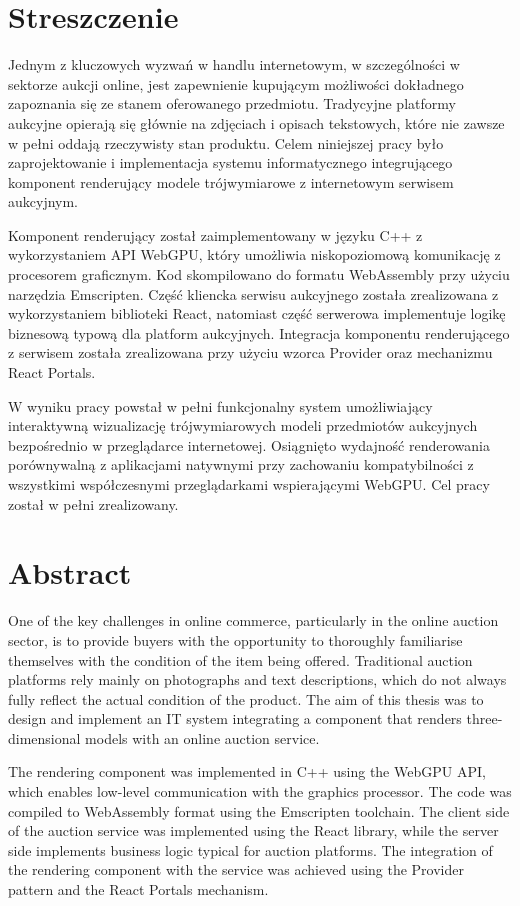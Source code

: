 \section*{Streszczenie}

Jednym z kluczowych wyzwań w handlu internetowym, w szczególności w sektorze aukcji online, jest zapewnienie kupującym możliwości dokładnego zapoznania się ze stanem oferowanego przedmiotu. Tradycyjne platformy aukcyjne opierają się głównie na zdjęciach i opisach tekstowych, które nie zawsze w pełni oddają rzeczywisty stan produktu. Celem niniejszej pracy było zaprojektowanie i implementacja systemu informatycznego integrującego komponent renderujący modele trójwymiarowe z internetowym serwisem aukcyjnym.

Komponent renderujący został zaimplementowany w języku C++ z wykorzystaniem API WebGPU, który umożliwia niskopoziomową komunikację z procesorem graficznym. Kod skompilowano do formatu WebAssembly przy użyciu narzędzia Emscripten. Część kliencka serwisu aukcyjnego została zrealizowana z wykorzystaniem biblioteki React, natomiast część serwerowa implementuje logikę biznesową typową dla platform aukcyjnych. Integracja komponentu renderującego z serwisem została zrealizowana przy użyciu wzorca Provider oraz mechanizmu React Portals.

W wyniku pracy powstał w pełni funkcjonalny system umożliwiający interaktywną wizualizację trójwymiarowych modeli przedmiotów aukcyjnych bezpośrednio w przeglądarce internetowej. Osiągnięto wydajność renderowania porównywalną z aplikacjami natywnymi przy zachowaniu kompatybilności z wszystkimi współczesnymi przeglądarkami wspierającymi WebGPU. Cel pracy został w pełni zrealizowany.

\section*{Abstract}

One of the key challenges in online commerce, particularly in the online auction sector, is to provide buyers with the opportunity to thoroughly familiarise themselves with the condition of the item being offered. Traditional auction platforms rely mainly on photographs and text descriptions, which do not always fully reflect the actual condition of the product. The aim of this thesis was to design and implement an IT system integrating a component that renders three-dimensional models with an online auction service.

The rendering component was implemented in C++ using the WebGPU API, which enables low-level communication with the graphics processor. The code was compiled to WebAssembly format using the Emscripten toolchain. The client side of the auction service was implemented using the React library, while the server side implements business logic typical for auction platforms. The integration of the rendering component with the service was achieved using the Provider pattern and the React Portals mechanism.

